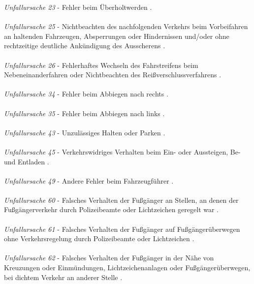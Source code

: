 \textit{Unfallursache 23} - Fehler beim Überholtwerden \parencite{PolizeiprasidiumOberbeyernSud.2016}.\\
\\
\textit{Unfallursache 25} - Nichtbeachten des nachfolgenden Verkehrs beim Vorbeifahren an haltenden Fahrzeugen, Absperrungen oder Hindernissen und/oder ohne rechtzeitige deutliche Ankündigung des Ausscherens \parencite{PolizeiprasidiumOberbeyernSud.2016}.\\
\\
\textit{Unfallursache 26} - Fehlerhaftes Wechseln des Fahrstreifens beim Nebeneinanderfahren oder Nichtbeachten des Reißverschlussverfahrens \parencite{PolizeiprasidiumOberbeyernSud.2016}.\\
\\
\textit{Unfallursache 34} - Fehler beim Abbiegen nach rechts \parencite{PolizeiprasidiumOberbeyernSud.2016}.\\
\\
\textit{Unfallursache 35} - Fehler beim Abbiegen nach links \parencite{PolizeiprasidiumOberbeyernSud.2016}.\\
\\
\textit{Unfallursache 43} - Unzulässiges Halten oder Parken \parencite{PolizeiprasidiumOberbeyernSud.2016}.\\
\\
\textit{Unfallursache 45} - Verkehrswidriges Verhalten beim Ein- oder Aussteigen, Be- und Entladen \parencite{PolizeiprasidiumOberbeyernSud.2016}.\\
\\
\textit{Unfallursache 49} - Andere Fehler beim Fahrzeugführer \parencite{PolizeiprasidiumOberbeyernSud.2016}.\\
\\
\textit{Unfallursache 60} - Falsches Verhalten der Fußgänger an Stellen, an denen der Fußgängerverkehr durch Polizeibeamte oder Lichtzeichen geregelt war \parencite{PolizeiprasidiumOberbeyernSud.2016}.\\
\\
\textit{Unfallursache 61} - Falsches Verhalten der Fußgänger auf Fußgängerüberwegen ohne Verkehrsregelung durch Polizeibeamte oder Lichtzeichen \parencite{PolizeiprasidiumOberbeyernSud.2016}.\\
\\
\textit{Unfallursache 62} - Falsches Verhalten der Fußgänger in der Nähe von Kreuzungen oder Einmündungen, Lichtzeichenanlagen oder Fußgängerüberwegen, bei dichtem Verkehr an anderer Stelle \parencite{PolizeiprasidiumOberbeyernSud.2016}.\\
